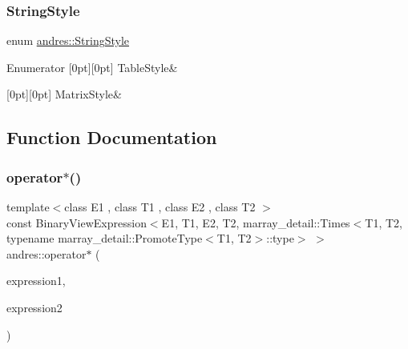 \subsubsection{\texorpdfstring{String\+Style}{StringStyle}}
{\footnotesize\ttfamily enum \hyperlink{namespaceandres_a69f07c437d156c7028c7d619e566281f}{andres\+::\+String\+Style}}

\begin{DoxyEnumFields}{Enumerator}
[0pt][0pt]{}\mbox{\label{namespaceandres_a69f07c437d156c7028c7d619e566281fa162a419d5299010966e7cc6a74e7b014}} 
Table\+Style&\\
\hline

[0pt][0pt]{}\mbox{\label{namespaceandres_a69f07c437d156c7028c7d619e566281fa8b1efd8fc40539ba5b5255b46440eeaf}} 
Matrix\+Style&\\
\hline

\end{DoxyEnumFields}


\subsection{Function Documentation}
\mbox{\label{namespaceandres_a37613f54e69908e108526ff99ad8b4ab}} 
\subsubsection{\texorpdfstring{operator$\ast$()}{operator*()}}
{\footnotesize\ttfamily template$<$class E1 , class T1 , class E2 , class T2 $>$ \\
const Binary\+View\+Expression$<$E1, T1, E2, T2, marray\+\_\+detail\+::\+Times$<$T1, T2, typename marray\+\_\+detail\+::\+Promote\+Type$<$T1, T2$>$\+::type$>$ $>$ andres\+::operator$\ast$ (\begin{DoxyParamCaption}\item[{const \hyperlink{classandres_1_1ViewExpression}{View\+Expression}$<$ E1, T1 $>$ \&}]{expression1,  }\item[{const \hyperlink{classandres_1_1ViewExpression}{View\+Expression}$<$ E2, T2 $>$ \&}]{expression2 }\end{DoxyParamCaption})\hspace{0.3cm}{\ttfamily [inline]}}


